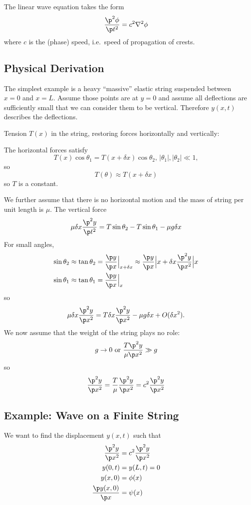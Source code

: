 \documentclass[a4paper]{article}
\begin{document}
The linear wave equation takes the form
\[
\frac{\p^2\phi}{\p t^2} = c^2\nabla^2\phi
\]
where \(c\) is the (phase) speed, i.e.\ speed of propagation of crests.

\subsection{Physical Derivation}

The simplest example is a heavy ``massive'' elastic string suspended between \(x=0\) and \(x=L\). Assume those points are at \(y=0\) and assume all deflections are sufficiently small that we can consider them to be vertical. Therefore \(y(x,t)\) describes the deflections.

Tension \(T(x)\) in the string, restoring forces horizontally and vertically:

The horizontal forces satisfy
\[
  T(x)\cos\theta_1 = T(x+\delta x)\cos\theta_2,\, |\theta_1|,|\theta_2| \ll 1,
\]
so
\[
T(\theta) \approx T(x+\delta x)
\]
so \(T\) is a constant.

We further assume that there is no horizontal motion and the mass of string per unit length is \(\mu\). The vertical force
\[
\mu\delta x \frac{\p^2 y}{\p t^2} = T\sin \theta_2 -T\sin\theta_1 - \mu g\delta x
\]
For small angles,
\begin{align*}
  \sin \theta_2 &\approx \tan\theta_2 = \frac{\p y}{\p x}\Big|_{x+\delta x} \approx \frac{\p y}{\p x}\Big|x + \delta x \frac{\p^2 y}{\p x^2}\Big|x \\
  \sin \theta_1 &\approx \tan\theta_1 = \frac{\p y}{\p x}\Big|_x
\end{align*}
so
\[
  \mu\delta x \frac{\p^2 y}{\p x^2} = T\delta x \frac{\p^2 y}{\p x^2} - \mu g\delta x + O(\delta x^2).
\]
We now assume that the weight of the string plays no role:
\[
  g\to 0 \text{ or } \frac{T\p^2 y}{\mu\p x^2} \gg g
\]
so
\[
  \frac{\p^2 y}{\p x^2} = \frac{T}{\mu} \frac{\p^2 y}{\p x^2} = c^2\frac{\p^2 y}{\p x^2}
\]

\subsection{Example: Wave on a Finite String}

We want to  find the displacement \(y(x,t)\) such that
\begin{align*}
  \frac{\p^2 y}{\p x^2} &= c^2 \frac{\p^2 y}{\p x^2} \\
  y(0,t) &= y(L,t) = 0 \\
  y(x,0) &= \phi(x) \\
  \frac{\p y(x,0)}{\p x} &= \psi(x)
\end{align*}
\end{document}
